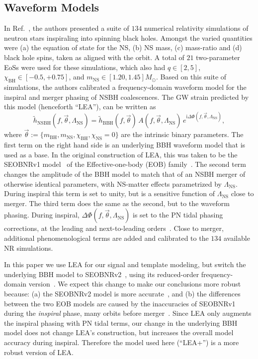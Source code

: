 \documentclass[aps,prd,amsmath,floats,floatfix, twocolumn,
superscriptaddress,nofootinbib,showpacs]{revtex4-1}
\newcommand{\lambdans}{\Lambda_\mathrm{NS}}
\newcommand{\ii}{\mathrm{i}}
\newcommand{\chibh}{\chi_\mathrm{BH}}
\newcommand{\chins}{\chi_\mathrm{NS}}
\newcommand{\mbh}{m_\mathrm{BH}}
\newcommand{\mns}{m_\mathrm{NS}}
\begin{document}
\subsection{Waveform Models}\label{s2:waveforms}

In Ref.~\cite{Lackey:2013axa}, the authors presented a suite of $134$ numerical
relativity simulations of neutron stars inspiraling into spinning black holes. Amongst
the varied quantities were (a) the equation of state for the NS, (b) NS mass, 
(c) mass-ratio and (d) black hole spins, taken as aligned with the orbit.
A total of $21$ two-parameter EoSs were used for these simulations, which also 
had $q\in[2, 5]$, $\chibh\in[-0.5, +0.75]$, and 
$m_\mathrm{NS}\in[1.20, 1.45]M_\odot$. Based on this suite of simulations, the
authors calibrated a frequency-domain waveform model for the inspiral and merger phasing of
NSBH coalescences. The GW strain predicted by this model (henceforth ``LEA''),
can be written as
% 
\begin{equation}
 \tilde{h}_\mathrm{NSBH}(f, \vec{\theta}, \lambdans) = \tilde{h}_\mathrm{BBH}(f, \vec{\theta})\,A(f, \vec{\theta}, \lambdans)\,e^{\ii \Delta\Phi(f, \vec{\theta}, \lambdans)},
\end{equation}
where $\vec{\theta}:=\{\mbh, \mns, \chibh,\chins=0\}$ are the intrinsic binary
parameters. The first term on the right hand side is an underlying
BBH waveform model that is used as a base. In the original construction of LEA,
this was taken to be the SEOBNRv1 model~\cite{Taracchini:2012} of the 
Effective-one-body (EOB) family~\cite{Buonanno99}. The second term changes the 
amplitude of the BBH model
to match that of an NSBH merger of otherwise identical parameters, with NS-matter
effects parametrized by $\lambdans$. During inspiral this term is set to
unity, but is a sensitive function of $\lambdans$ close to merger. The third 
term does the same as the second, but to the waveform phasing. During inspiral,
$\Delta\Phi(f, \vec{\theta}, \lambdans)$ is set to the PN tidal phasing corrections,
at the leading and next-to-leading orders~\cite{Vines2011}. Close to merger,
additional phenomenological terms are added and calibrated to the $134$ available
NR simulations.

In this paper we use LEA for our signal and template modeling, but switch the 
underlying BBH model to SEOBNRv2~\cite{Taracchini:2013rva},
using its reduced-order frequency-domain version~\cite{Purrer:2015tud}. We
expect this change to make our conclusions more robust because: (a) the 
SEOBNRv2 model is more accurate~\cite{Kumar:2015tha,Kumar:2016dhh}, and (b)
the differences between the two EOB models are caused by the
inaccuracies of SEOBNRv1 during the {\it inspiral} phase, many orbits before 
merger~\cite{Kumar:2015tha}.
Since LEA only augments the inspiral phasing with PN tidal terms, our
change in the underlying BBH model does not change LEA's construction, but
increases the overall model accuracy during inspiral. Therefore the model used 
here (``LEA+'') is a more robust version of LEA.
\end{document}
